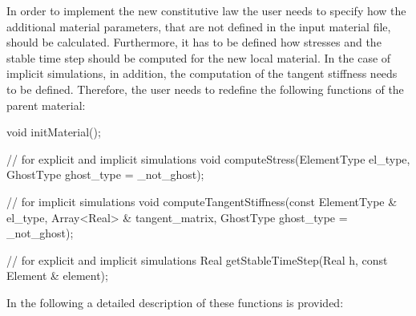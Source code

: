 In order to implement the new constitutive law the user needs to
specify how the additional material parameters, that are not
defined in the input material file, should be calculated. Furthermore,
it has to be defined how stresses and the stable time step should be
computed for the new local material. In the case of implicit
simulations, in addition, the computation of the tangent stiffness needs
to be defined. Therefore, the user needs to redefine the following
functions of the parent material:
\begin{cpp}
void initMaterial();

// for explicit and implicit simulations void
computeStress(ElementType el_type, GhostType ghost_type = _not_ghost);

// for implicit simulations
void computeTangentStiffness(const ElementType & el_type,
			     Array<Real> & tangent_matrix,
			     GhostType ghost_type = _not_ghost);

// for explicit and implicit simulations
Real getStableTimeStep(Real h, const Element & element);
\end{cpp}
In the following a detailed description of these functions is provided:
